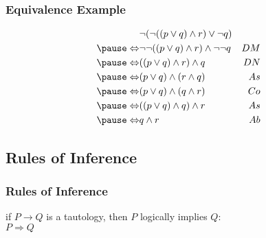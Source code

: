 \documentclass[dvipsnames]{beamer}
\begin{document}
\begin{frame}
  \frametitle{Equivalence Example}

  \begin{example}
    \begin{eqnarray*}
                      & \neg (\neg ((p \vee q) \wedge r) \vee \neg q)      &\\
      \pause
      \Leftrightarrow & \neg \neg ((p \vee q) \wedge r) \wedge \neg \neg q & DM\\
      \pause
      \Leftrightarrow & ((p \vee q) \wedge r) \wedge q                     & DN\\
      \pause
      \Leftrightarrow & (p \vee q) \wedge (r \wedge q)                     & As\\
      \pause
      \Leftrightarrow & (p \vee q) \wedge (q \wedge r)                     & Co\\
      \pause
      \Leftrightarrow & ((p \vee q) \wedge q) \wedge r                     & As\\
      \pause
      \Leftrightarrow & q \wedge r                                         & Ab
    \end{eqnarray*}
  \end{example}
\end{frame}

\subsection{Rules of Inference}

\begin{frame}
  \frametitle{Rules of Inference}

  \begin{definition}
    if $P \rightarrow Q$ is a tautology, then $P$ \alert{logically implies} $Q$:\\
    $P \Rightarrow Q$
  \end{definition}
\end{frame}
\end{document}
